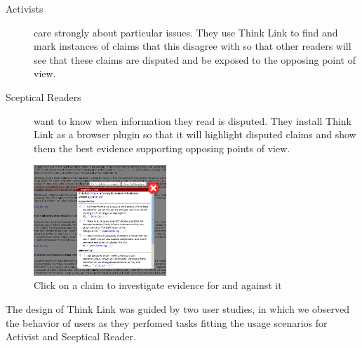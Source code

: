 \documentclass{chi2009}
\newcommand{\todo}[1]{}
\begin{document}
\begin{description}
\item[Activists] care strongly about particular issues. They use Think Link to find and mark instances of claims that this disagree with so that other readers will see that these claims are disputed and be exposed to the opposing point of view.

\item[Sceptical Readers] want to know when information they read is disputed. They install Think Link as a browser plugin so that it will highlight disputed claims and show them the best evidence supporting opposing points of view.
\end{description}

\begin{figure}[tb]
	\begin{center}
	\includegraphics[width=5cm]{../screenshots/v2_popup_dim.png}
	\caption{Click on a claim to investigate evidence for and against it}
	\label{claimview}
	\end{center}
\end{figure}

\todo{Claim panel should have 'more' buttons}


The design of Think Link was guided by two user studies, in which we observed the behavior of users as they perfomed tasks fitting the usage scenarios for Activist and Sceptical Reader.

\todo{Talk about automatically including all arguments from Snopes}
\todo{I think we need to do some kind of evaluation of the new interface, even if it is just showing it to some people, or having people in the lab try it.}
\todo{Need figures saying how efficient it is for an activist user to mark up a topic}

\end{document}
